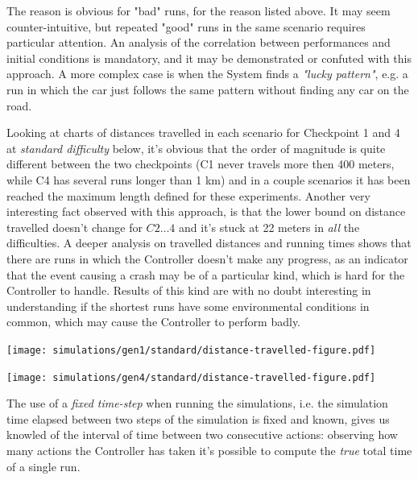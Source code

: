 The reason is obvious for "bad" runs, for the reason listed above. It may seem counter-intuitive, but repeated "good" runs in the same scenario requires particular attention. An analysis of the correlation between performances and initial conditions is mandatory, and it may be demonstrated or confuted with this approach. A more complex case is when the System finds a \textsl{"lucky pattern"}, e.g. a run in which the car just follows the same pattern without finding any car on the road.\newline

Looking at charts of distances travelled in each scenario for Checkpoint 1 and 4 at \textsl{standard difficulty} below, it's obvious that the order of magnitude is quite different between the two checkpoints (C1 never travels more then 400 meters, while C4 has several runs longer than 1 km) and in a couple scenarios it has been reached the maximum length defined for these experiments.
Another very interesting fact observed with this approach, is that the lower bound on distance travelled doesn't change for $C2\dots 4$ and it's stuck at 22 meters in \textsl{all} the difficulties. A deeper analysis on travelled distances and running times shows that there are runs in which the Controller doesn't make any progress, as an indicator that the event causing a crash may be of a particular kind, which is hard for the Controller to handle. Results of this kind are with no doubt interesting in understanding if the shortest runs have some environmental conditions in common, which may cause the Controller to perform badly.

\begin{minipage}[c]{\textwidth}
	\texttt{[image: simulations/gen1/standard/distance-travelled-figure.pdf]}

	\texttt{[image: simulations/gen4/standard/distance-travelled-figure.pdf]}
\end{minipage}

The use of a \textsl{fixed time-step} when running the simulations, i.e. the simulation time elapsed between two steps of the simulation is fixed and known, gives us knowled of the interval of time between two consecutive actions: observing how many actions the Controller has taken it's possible to compute the \textsl{true} total time of a single run.

